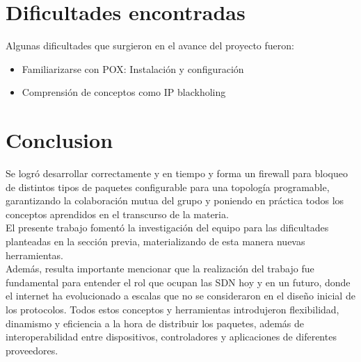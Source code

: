 \documentclass[titlepage,a4paper]{article}
\begin{document}
    \section{Dificultades encontradas}\label{sec:dificultadesEncontras}
    Algunas dificultades que surgieron en el avance del proyecto fueron:
    
    \begin{itemize}
        \item Familiarizarse con POX: Instalación y configuración
        \item Comprensión de conceptos como IP blackholing
    \end{itemize}
    
\section{Conclusion}\label{conclusion}
    Se logró desarrollar correctamente y en tiempo y forma un firewall para bloqueo de distintos tipos de paquetes configurable para una topología programable, garantizando la colaboración mutua del grupo y poniendo en práctica todos los conceptos aprendidos en el transcurso de la materia.
    \\
    El presente trabajo fomentó la investigación del equipo para las dificultades planteadas en la sección previa, materializando de esta manera nuevas herramientas.
    \\
    Además, resulta importante mencionar que la realización del trabajo fue fundamental para entender el rol que ocupan las SDN hoy y en un futuro, donde el internet ha evolucionado a escalas que no se consideraron en el diseño inicial de los protocolos. Todos estos conceptos y herramientas introdujeron flexibilidad, dinamismo y eficiencia a la hora de distribuir los paquetes, además de interoperabilidad entre dispositivos, controladores y aplicaciones de diferentes proveedores.
\end{document}
